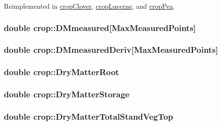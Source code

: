 Reimplemented in \hyperlink{classcrop_clover_a9b3c11041d71e6050fe2831c22318ed3}{cropClover}, \hyperlink{classcrop_lucerne_a8b4d1f5dcb870fac95a5f4e1d1030617}{cropLucerne}, and \hyperlink{classcrop_pea_a74e2cc41cbccf0a208430b23a1267853}{cropPea}.\hypertarget{classcrop_ab89c9b8db9ad838549d4072dceeb2687}{
\subsubsection[{DMmeasured}]{\setlength{\rightskip}{0pt plus 5cm}double {\bf crop::DMmeasured}\mbox{[}MaxMeasuredPoints\mbox{]}}}
\label{classcrop_ab89c9b8db9ad838549d4072dceeb2687}
\hypertarget{classcrop_aec9af11e7b2b4fef9fe6c3b5bc892fa4}{
\subsubsection[{DMmeasuredDeriv}]{\setlength{\rightskip}{0pt plus 5cm}double {\bf crop::DMmeasuredDeriv}\mbox{[}MaxMeasuredPoints\mbox{]}}}
\label{classcrop_aec9af11e7b2b4fef9fe6c3b5bc892fa4}
\hypertarget{classcrop_a3c5f4942cf46d45168caf4da80b79537}{
\subsubsection[{DryMatterRoot}]{\setlength{\rightskip}{0pt plus 5cm}double {\bf crop::DryMatterRoot}}}
\label{classcrop_a3c5f4942cf46d45168caf4da80b79537}
\hypertarget{classcrop_a4a2803c0618d2f662abfa8d230c811df}{
\subsubsection[{DryMatterStorage}]{\setlength{\rightskip}{0pt plus 5cm}double {\bf crop::DryMatterStorage}}}
\label{classcrop_a4a2803c0618d2f662abfa8d230c811df}
\hypertarget{classcrop_ae5c58459f879a52a543bc517918513fd}{
\subsubsection[{DryMatterTotalStandVegTop}]{\setlength{\rightskip}{0pt plus 5cm}double {\bf crop::DryMatterTotalStandVegTop}}}
